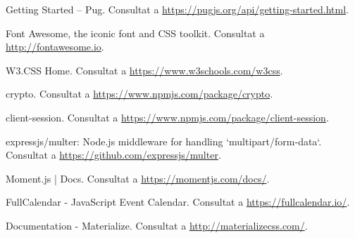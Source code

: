 \documentclass[11pt,catalan,listoffigures,listoftables]{tfgetsinf}
\begin{document}
\begin{thebibliography}{10}
   Getting Started – Pug.
   \newblock Consultat a 
   \url{https://pugjs.org/api/getting-started.html}.   

   Font Awesome, the iconic font and CSS toolkit.
   \newblock Consultat a 
   \url{http://fontawesome.io}. 
   
   W3.CSS Home.
   \newblock Consultat a 
   \url{https://www.w3schools.com/w3css}.
   
   crypto.
   \newblock Consultat a 
   \url{https://www.npmjs.com/package/crypto}.
   
   client-session.
   \newblock Consultat a 
   \url{https://www.npmjs.com/package/client-session}.
   
   expressjs/multer: Node.js middleware for handling `multipart/form-data`.
   \newblock Consultat a 
   \url{https://github.com/expressjs/multer}.
   
   Moment.js | Docs.
   \newblock Consultat a 
   \url{https://momentjs.com/docs/}.

   FullCalendar - JavaScript Event Calendar.
   \newblock Consultat a 
   \url{https://fullcalendar.io/}.
   
   Documentation - Materialize.
   \newblock Consultat a 
   \url{http://materializecss.com/}.

\end{thebibliography}
\cleardoublepage
\end{document}
